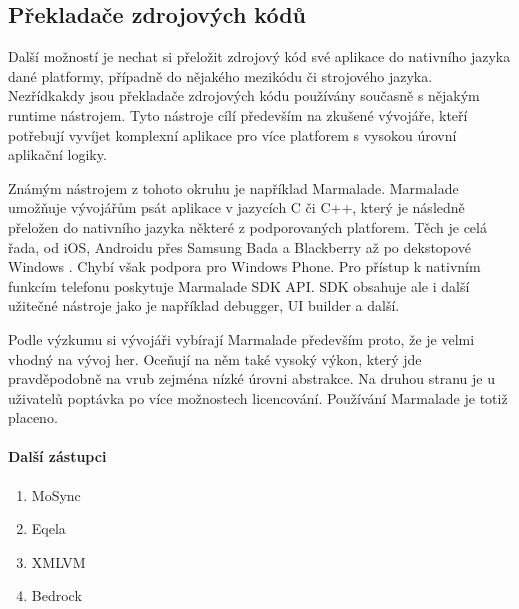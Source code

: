 \subsection{Překladače zdrojových kódů}
Další možností je nechat si přeložit zdrojový kód své aplikace do nativního jazyka dané platformy, případně do nějakého mezikódu či strojového jazyka. Nezřídkakdy jsou překladače zdrojových kódu používány současně s nějakým runtime nástrojem. Tyto nástroje cílí především na zkušené vývojáře, kteří potřebují vyvíjet komplexní aplikace pro více platforem s vysokou úrovní aplikační logiky.

Známým nástrojem z tohoto okruhu je například Marmalade. Marmalade umožňuje vývojářům psát aplikace v jazycích C či C++, který je následně přeložen do nativního jazyka některé z podporovaných platforem. Těch je celá řada, od iOS, Androidu přes Samsung Bada a Blackberry až po dekstopové Windows \cite{marmalade}. Chybí však podpora pro Windows Phone. Pro přístup k nativním funkcím telefonu poskytuje Marmalade SDK API. SDK obsahuje ale i další užitečné nástroje jako je například debugger, UI builder a další.

Podle výzkumu \cite{visionmobile_survey} si vývojáři vybírají Marmalade především proto, že je velmi vhodný na vývoj her. Oceňují na něm také vysoký výkon, který jde pravděpodobně na vrub zejména nízké úrovni abstrakce. Na druhou stranu je u uživatelů poptávka po více možnostech licencování. Používání Marmalade je totiž placeno.

\paragraph{Další zástupci}
\begin{enumerate}
	\item MoSync
	\item Eqela
	\item XMLVM
	\item Bedrock
\end{enumerate}